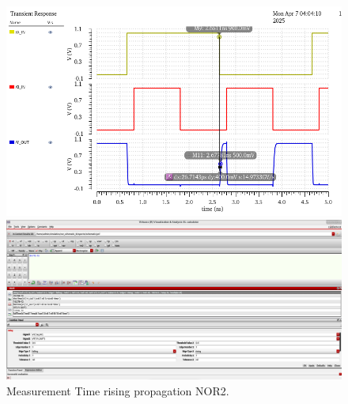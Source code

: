 \begin{figure}[H]
	\begin{minipage}{0.5\linewidth}
		\includegraphics[width=\linewidth]{section/EX1/NOR/EX1_NOR2_Tpdr_Waveform.png}
	\end{minipage}
	\begin{minipage}{0.5\linewidth}
		\includegraphics[width=\linewidth]{section/EX1/NOR/EX1_NOR2_Tpdr_Cal.png}
	\end{minipage}
	\caption{Measurement Time rising propagation NOR2.}
\end{figure}

